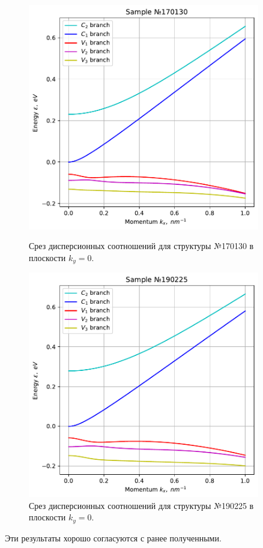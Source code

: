 \documentclass[../main.tex]{subfiles}
\begin{document}
    \begin{figure}[h]
        \begin{minipage}[h]{0.49\textwidth}
            \includegraphics[width=0.9\textwidth]{./images/sample_170130_013.pdf}
            \caption{Срез дисперсионных соотношений для структуры №170130 в плоскости $k_y = 0$. \label{sample_170130_spectrum}}
        \end{minipage}
        \hfill
        \begin{minipage}[h]{0.49\textwidth}
            \includegraphics[width=0.9\textwidth]{./images/sample_190225_013.pdf}
            \caption{Срез дисперсионных соотношений для структуры №190225 в плоскости $k_y = 0$. \label{sample_190225_spectrum}}
        \end{minipage}
    \end{figure}

    Эти результаты хорошо согласуются с ранее полученными.
\end{document}
